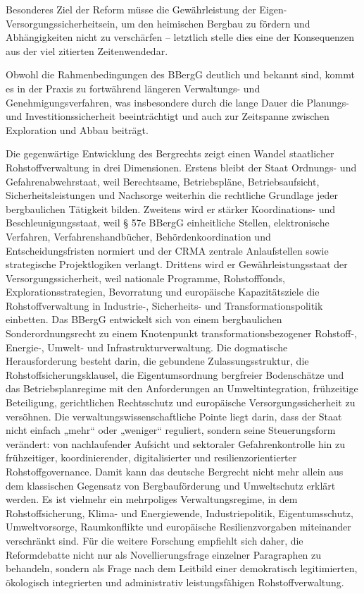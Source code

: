 \documentclass[12pt,a4paper,oneside]{book} %
\begin{document}
Besonderes Ziel der Reform müsse die Gewährleistung der \glqq Eigen-Versorgungssicherheit\grqq sein, um den heimischen Bergbau zu fördern und Abhängigkeiten nicht zu verschärfen -- letztlich stelle dies \glqq eine der Konsequenzen aus der viel zitierten \glq Zeitenwende\grq\grqq dar.\autocite{Frenz 2025, S. 315} 

Obwohl die Rahmenbedingungen des BBergG deutlich und bekannt sind, kommt es in der Praxis zu fortwährend längeren Verwaltungs- und Genehmigungsverfahren, was insbesondere durch die lange Dauer die Planungs- und Investitionssicherheit beeinträchtigt\autocite{Frenz 2025, S: 653} und auch zur Zeitspanne zwischen Exploration und Abbau beiträgt.

Die gegenwärtige Entwicklung des Bergrechts zeigt einen Wandel staatlicher Rohstoffverwaltung in drei Dimensionen. Erstens bleibt der Staat Ordnungs- und Gefahrenabwehrstaat, weil Berechtsame, Betriebspläne, Betriebsaufsicht, Sicherheitsleistungen und Nachsorge weiterhin die rechtliche Grundlage jeder bergbaulichen Tätigkeit bilden. Zweitens wird er stärker Koordinations- und Beschleunigungsstaat, weil § 57e BBergG einheitliche Stellen, elektronische Verfahren, Verfahrenshandbücher, Behördenkoordination und Entscheidungsfristen normiert und der CRMA zentrale Anlaufstellen sowie strategische Projektlogiken verlangt. Drittens wird er Gewährleistungsstaat der Versorgungssicherheit, weil nationale Programme, Rohstofffonds, Explorationsstrategien, Bevorratung und europäische Kapazitätsziele die Rohstoffverwaltung in Industrie-, Sicherheits- und Transformationspolitik einbetten. Das BBergG entwickelt sich von einem bergbaulichen Sonderordnungsrecht zu einem Knotenpunkt transformationsbezogener Rohstoff-, Energie-, Umwelt- und Infrastrukturverwaltung. Die dogmatische Herausforderung besteht darin, die gebundene Zulassungsstruktur, die Rohstoffsicherungsklausel, die Eigentumsordnung bergfreier Bodenschätze und das Betriebsplanregime mit den Anforderungen an Umweltintegration, frühzeitige Beteiligung, gerichtlichen Rechtsschutz und europäische Versorgungssicherheit zu versöhnen. Die verwaltungswissenschaftliche Pointe liegt darin, dass der Staat nicht einfach „mehr“ oder „weniger“ reguliert, sondern seine Steuerungsform verändert: von nachlaufender Aufsicht und sektoraler Gefahrenkontrolle hin zu frühzeitiger, koordinierender, digitalisierter und resilienzorientierter Rohstoffgovernance. Damit kann das deutsche Bergrecht nicht mehr allein aus dem klassischen Gegensatz von Bergbauförderung und Umweltschutz erklärt werden. Es ist vielmehr ein mehrpoliges Verwaltungsregime, in dem Rohstoffsicherung, Klima- und Energiewende, Industriepolitik, Eigentumsschutz, Umweltvorsorge, Raumkonflikte und europäische Resilienzvorgaben miteinander verschränkt sind. Für die weitere Forschung empfiehlt sich daher, die Reformdebatte nicht nur als Novellierungsfrage einzelner Paragraphen zu behandeln, sondern als Frage nach dem Leitbild einer demokratisch legitimierten, ökologisch integrierten und administrativ leistungsfähigen Rohstoffverwaltung.
\end{document}
